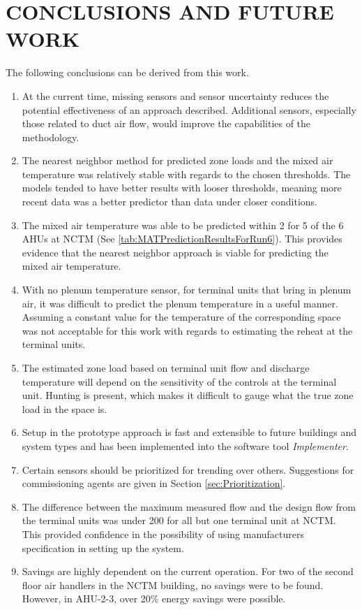 \chapter{\texorpdfstring{\MakeUppercase{Conclusions and Future Work}}{Conclusions and Future Work}} 

The following conclusions can be derived from this work.

\begin{enumerate}
    \item At the current time, missing sensors and sensor uncertainty 
        reduces the potential effectiveness of an approach described. 
        Additional sensors, especially those related to duct air flow,
        would improve the capabilities of the methodology. 
    \item The nearest neighbor method for predicted zone loads and the
        mixed air temperature was relatively stable with regards to the chosen
        thresholds. The models tended to have better results with looser
        thresholds, meaning more recent data was a better predictor than
        data under closer conditions. 
    \item The mixed air temperature was able to be predicted within
        \SI{2}{\degF} for 5 of the 6 AHUs at NCTM (See \tableref{}
        \ref{tab:MATPredictionResultsForRun6}). This provides evidence
        that the nearest neighbor approach is viable for predicting the
        mixed air temperature. 
    \item With no plenum temperature sensor, for terminal units that
        bring in plenum air, it was difficult to predict the plenum
        temperature in a useful manner. Assuming a constant value for the
        temperature of the corresponding space was not acceptable for
        this work with regards to estimating the reheat at the terminal units.
    \item The estimated zone load based on terminal unit flow and
        discharge temperature will depend on the sensitivity of the
        controls at the terminal unit. Hunting is present, which makes
        it difficult to gauge what the true zone load in the space is. 
    \item Setup in the prototype approach is fast and extensible to
        future buildings and system types and has been implemented into
        the software tool \textit{Implementer}. 
    \item Certain sensors should be prioritized for trending over
        others. Suggestions for commissioning agents are given in
        Section \ref{sec:Prioritization}. 
    \item The difference between the maximum measured flow and the design flow
        from the terminal units was under \SI{200}{\CFM} for all but one
        terminal unit at NCTM. This provided confidence in the
        possibility of using manufacturers specification in setting up
        the system. 
    \item Savings are highly dependent on the current operation. For two
        of the second floor air handlers in the NCTM building, no
        savings were to be found. However, in AHU-2-3, over 20\% energy
        savings were possible. 
\end{enumerate}

